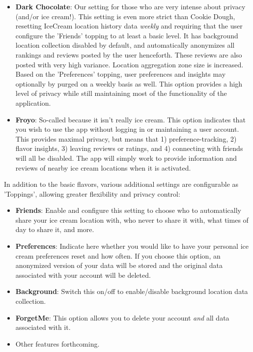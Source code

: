 \documentclass{article}
\providecommand{\tightlist}{
    \setlength{\itemsep}{0pt}\setlength{\parskip}{0pt}
}
\begin{document}
\begin{itemize}
  \item \textbf{Dark Chocolate}: Our setting for those who are very intense about privacy (and/or ice cream!). This setting is even more strict than Cookie Dough, resetting IceCream location history data \textit{weekly} and requiring that the user configure the 'Friends' topping to at least a basic level. It has background location collection disabled by default, and automatically anonymizes all rankings and reviews posted by the user henceforth. These reviews are also posted with very high variance. Location aggregation zone size is increased. Based on the 'Preferences' topping, user preferences and insights may optionally by purged on a weekly basis as well. This option provides a high level of privacy while still maintaining most of the functionality of the application.
  \item \textbf{Froyo}: So-called because it isn't really ice cream. This option indicates that you wish to use the app without logging in or maintaining a user account. This provides maximal privacy, but means that 1) preference-tracking, 2) flavor insights, 3) leaving reviews or ratings, and 4) connecting with friends will all be disabled. The app will simply work to provide information and reviews of nearby ice cream locations when it is activated.
\end{itemize}

In addition to the basic flavors, various additional settings are configurable as 'Toppings', allowing greater flexibility and privacy control:
\begin{itemize}\tightlist
  \item \textbf{Friends}: Enable and configure this setting to choose who to automatically share your ice cream location with, who never to share it with, what times of day to share it, and more.
  \item \textbf{Preferences}: Indicate here whether you would like to have your personal ice cream preferences reset and how often. If you choose this option, an anonymized version of your data will be stored and the original data associated with your account will be deleted.
  \item \textbf{Background}: Switch this on/off to enable/disable background location data collection.
  \item \textbf{ForgetMe}: This option allows you to delete your account \textit{and} all data associated with it.
  \item Other features forthcoming.
\end{itemize}
\end{document}
